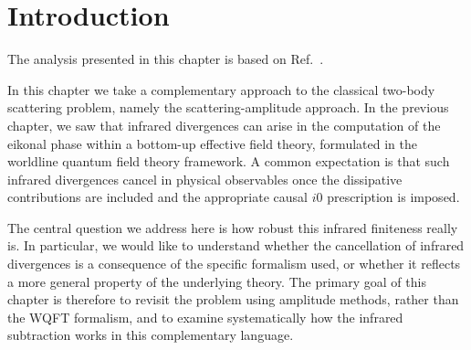 \section{Introduction}
The analysis presented in this chapter is based on Ref.~\cite{Bhattacharyya:2025heterotic}.
{\color{black}
In this chapter we take a complementary approach to the classical two-body scattering problem, namely the scattering-amplitude approach. In the previous chapter, we saw that infrared divergences can arise in the computation of the eikonal phase within a bottom-up effective field theory, formulated in the worldline quantum field theory framework. A common expectation is that such infrared divergences cancel in physical observables once the dissipative contributions are included and the appropriate causal \(i0\) prescription is imposed.

The central question we address here is how robust this infrared finiteness really is. In particular, we would like to understand whether the cancellation of infrared divergences is a consequence of the specific formalism used, or whether it reflects a more general property of the underlying theory. The primary goal of this chapter is therefore to revisit the problem using amplitude methods, rather than the WQFT formalism, and to examine systematically how the infrared subtraction works in this complementary language. 

}
